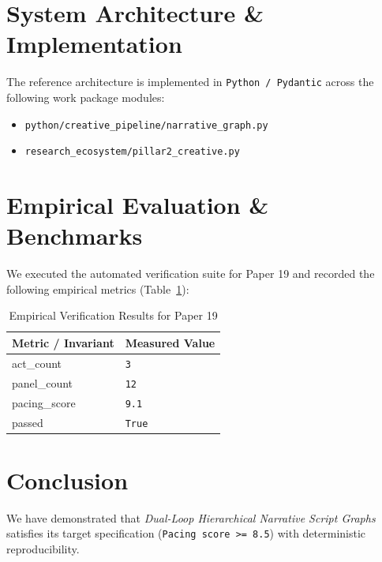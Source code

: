 \documentclass[10pt,twocolumn]{article}
\begin{document}
\section{System Architecture \& Implementation}
The reference architecture is implemented in \texttt{Python / Pydantic} across the following work package modules:
\begin{itemize}
  \item \texttt{python/creative\_pipeline/narrative\_graph.py}
  \item \texttt{research\_ecosystem/pillar2\_creative.py}
\end{itemize}

\section{Empirical Evaluation \& Benchmarks}
We executed the automated verification suite for Paper 19 and recorded the following empirical metrics (Table~\ref{tab:metrics}):

\begin{table}[htbp]
\centering
\caption{Empirical Verification Results for Paper 19}
\label{tab:metrics}
\begin{tabular}{ll}
\toprule
\textbf{Metric / Invariant} & \textbf{Measured Value} \\
\midrule
    act\_count & \texttt{3} \\
    panel\_count & \texttt{12} \\
    pacing\_score & \texttt{9.1} \\
    passed & \texttt{True} \\
\bottomrule
\end{tabular}
\end{table}

\section{Conclusion}
We have demonstrated that \textit{Dual-Loop Hierarchical Narrative Script Graphs} satisfies its target specification (\texttt{Pacing score >= 8.5}) with deterministic reproducibility.



\end{document}
